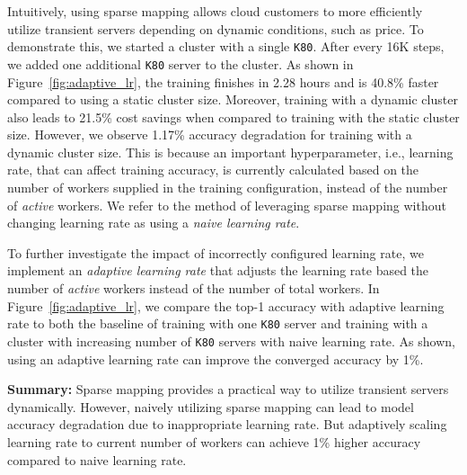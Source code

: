 Intuitively, using sparse mapping allows cloud customers to  more efficiently
utilize transient servers depending on dynamic conditions, such as price. To
demonstrate this, we started a cluster  with a single \texttt{K80}. After every
16K steps, we added one additional \texttt{K80} server to the cluster. As shown
in Figure~\ref{fig:adaptive_lr}, the training finishes in 2.28 hours and is 40.8\% faster compared
to using a static cluster size.  Moreover, training with a dynamic cluster
also leads to 21.5\%  cost savings when compared to training with the
static cluster size. However, we observe 1.17\% accuracy degradation for
training with a dynamic cluster size. This is because an important
hyperparameter, i.e., learning rate, that can affect training accuracy, is
currently calculated based on the number of workers supplied in the training
configuration, instead of the number of \emph{active} workers. We refer to the
method of leveraging sparse mapping without changing learning rate as using a \emph{naive
learning rate}. 


To further investigate the impact of incorrectly configured learning rate, we
implement an \emph{adaptive learning rate} that adjusts the learning rate based
the number of \emph{active} workers instead of the number of total workers. In Figure~\ref{fig:adaptive_lr}, we compare the top-1 accuracy
with adaptive learning rate to both the baseline of training
with one \texttt{K80} server and training with a cluster with increasing number
of \texttt{K80} servers with naive learning rate. As shown, using an adaptive learning rate can improve the
converged accuracy by 1\%. 

\textbf{Summary:} Sparse mapping provides a practical way to utilize transient
servers dynamically. However, naively utilizing sparse mapping can lead to
model accuracy degradation due to inappropriate learning rate. But adaptively scaling
learning rate to current number of workers can achieve 
1\% higher accuracy compared to naive learning rate.



